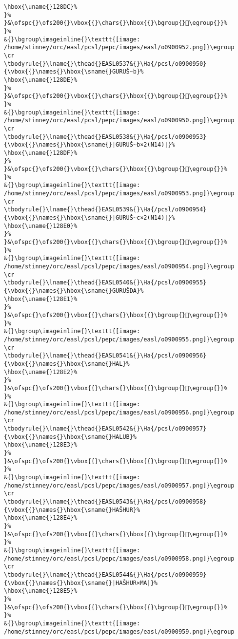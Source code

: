 \begin{verbatim}
\hbox{\uname{}128DC}%
}%
}&\ofspc{}\ofs200{}\vbox{{}\chars{}\hbox{{}\bgroup{}𒣜\egroup{}}%
}%
&{}\bgroup\imageinline{}\texttt{[image: /home/stinney/orc/easl/pcsl/pepc/images/easl/o0900952.png]}\egroup
\cr
\tbodyrule{}\lname{}\thead{}EASL0537&{}\Ha{/pcsl/o0900950}{\vbox{{}\names{}\hbox{\sname{}GURUŠ∼b}%
\hbox{\uname{}128DE}%
}%
}&\ofspc{}\ofs200{}\vbox{{}\chars{}\hbox{{}\bgroup{}𒣞\egroup{}}%
}%
&{}\bgroup\imageinline{}\texttt{[image: /home/stinney/orc/easl/pcsl/pepc/images/easl/o0900950.png]}\egroup
\cr
\tbodyrule{}\lname{}\thead{}EASL0538&{}\Ha{/pcsl/o0900953}{\vbox{{}\names{}\hbox{\sname{}|GURUŠ∼b×2(N14)|}%
\hbox{\uname{}128DF}%
}%
}&\ofspc{}\ofs200{}\vbox{{}\chars{}\hbox{{}\bgroup{}𒣟\egroup{}}%
}%
&{}\bgroup\imageinline{}\texttt{[image: /home/stinney/orc/easl/pcsl/pepc/images/easl/o0900953.png]}\egroup
\cr
\tbodyrule{}\lname{}\thead{}EASL0539&{}\Ha{/pcsl/o0900954}{\vbox{{}\names{}\hbox{\sname{}|GURUŠ∼c×2(N14)|}%
\hbox{\uname{}128E0}%
}%
}&\ofspc{}\ofs200{}\vbox{{}\chars{}\hbox{{}\bgroup{}𒣠\egroup{}}%
}%
&{}\bgroup\imageinline{}\texttt{[image: /home/stinney/orc/easl/pcsl/pepc/images/easl/o0900954.png]}\egroup
\cr
\tbodyrule{}\lname{}\thead{}EASL0540&{}\Ha{/pcsl/o0900955}{\vbox{{}\names{}\hbox{\sname{}GURUŠDA}%
\hbox{\uname{}128E1}%
}%
}&\ofspc{}\ofs200{}\vbox{{}\chars{}\hbox{{}\bgroup{}𒣡\egroup{}}%
}%
&{}\bgroup\imageinline{}\texttt{[image: /home/stinney/orc/easl/pcsl/pepc/images/easl/o0900955.png]}\egroup
\cr
\tbodyrule{}\lname{}\thead{}EASL0541&{}\Ha{/pcsl/o0900956}{\vbox{{}\names{}\hbox{\sname{}HAL}%
\hbox{\uname{}128E2}%
}%
}&\ofspc{}\ofs200{}\vbox{{}\chars{}\hbox{{}\bgroup{}𒣢\egroup{}}%
}%
&{}\bgroup\imageinline{}\texttt{[image: /home/stinney/orc/easl/pcsl/pepc/images/easl/o0900956.png]}\egroup
\cr
\tbodyrule{}\lname{}\thead{}EASL0542&{}\Ha{/pcsl/o0900957}{\vbox{{}\names{}\hbox{\sname{}HALUB}%
\hbox{\uname{}128E3}%
}%
}&\ofspc{}\ofs200{}\vbox{{}\chars{}\hbox{{}\bgroup{}𒣣\egroup{}}%
}%
&{}\bgroup\imageinline{}\texttt{[image: /home/stinney/orc/easl/pcsl/pepc/images/easl/o0900957.png]}\egroup
\cr
\tbodyrule{}\lname{}\thead{}EASL0543&{}\Ha{/pcsl/o0900958}{\vbox{{}\names{}\hbox{\sname{}HAŠHUR}%
\hbox{\uname{}128E4}%
}%
}&\ofspc{}\ofs200{}\vbox{{}\chars{}\hbox{{}\bgroup{}𒣤\egroup{}}%
}%
&{}\bgroup\imageinline{}\texttt{[image: /home/stinney/orc/easl/pcsl/pepc/images/easl/o0900958.png]}\egroup
\cr
\tbodyrule{}\lname{}\thead{}EASL0544&{}\Ha{/pcsl/o0900959}{\vbox{{}\names{}\hbox{\sname{}|HAŠHUR×MA|}%
\hbox{\uname{}128E5}%
}%
}&\ofspc{}\ofs200{}\vbox{{}\chars{}\hbox{{}\bgroup{}𒣥\egroup{}}%
}%
&{}\bgroup\imageinline{}\texttt{[image: /home/stinney/orc/easl/pcsl/pepc/images/easl/o0900959.png]}\egroup

\end{verbatim}
